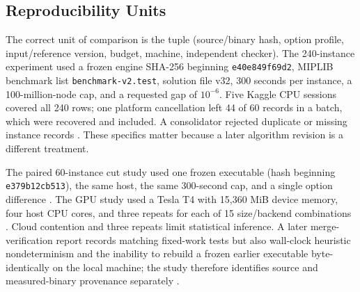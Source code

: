 \documentclass[10pt,a4paper,twocolumn]{article}
\newcommand{\smallpath}[1]{\nolinkurl{#1}}
\begin{document}
\subsection{Reproducibility Units}

The correct unit of comparison is the tuple (source/binary hash, option profile, input/reference version, budget, machine, independent checker). The 240-instance experiment used a frozen engine SHA-256 beginning \texttt{e40e849f69d2}, MIPLIB benchmark list \smallpath{benchmark-v2.test}, solution file v32, 300 seconds per instance, a 100-million-node cap, and a requested gap of $10^{-6}$. Five Kaggle CPU sessions covered all 240 rows; one platform cancellation left 44 of 60 records in a batch, which were recovered and included. A consolidator rejected duplicate or missing instance records \cite{mip240}. These specifics matter because a later algorithm revision is a different treatment.

The paired 60-instance cut study used one frozen executable (hash beginning \texttt{e379b12cb513}), the same host, the same 300-second cap, and a single option difference \cite{iter37}. The GPU study used a Tesla T4 with 15,360 MiB device memory, four host CPU cores, and three repeats for each of 15 size/backend combinations \cite{gpu03}. Cloud contention and three repeats limit statistical inference. A later merge-verification report records matching fixed-work tests but also wall-clock heuristic nondeterminism and the inability to rebuild a frozen earlier executable byte-identically on the local machine; the study therefore identifies source and measured-binary provenance separately \cite{merge}.
\end{document}
